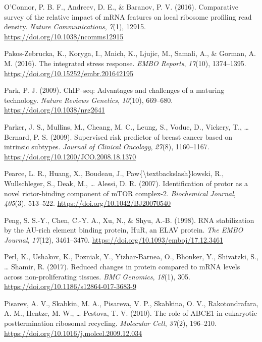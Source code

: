 \documentclass[12pt,openany]{book}
\begin{document}
\hypertarget{ref-OConnor2016}{}
O'Connor, P. B. F., Andreev, D. E., \& Baranov, P. V. (2016).
Comparative survey of the relative impact of mRNA features on local
ribosome profiling read density. \emph{Nature Communications},
\emph{7}(1), 12915. \url{https://doi.org/10.1038/ncomms12915}

\hypertarget{ref-Pakos-Zebrucka2016}{}
Pakos-Zebrucka, K., Koryga, I., Mnich, K., Ljujic, M., Samali, A., \&
Gorman, A. M. (2016). The integrated stress response. \emph{EMBO
Reports}, \emph{17}(10), 1374--1395.
\url{https://doi.org/10.15252/embr.201642195}

\hypertarget{ref-Park2009}{}
Park, P. J. (2009). ChIP--seq: Advantages and challenges of a maturing
technology. \emph{Nature Reviews Genetics}, \emph{10}(10), 669--680.
\url{https://doi.org/10.1038/nrg2641}

\hypertarget{ref-Parker2009}{}
Parker, J. S., Mullins, M., Cheang, M. C., Leung, S., Voduc, D.,
Vickery, T., \ldots{} Bernard, P. S. (2009). Supervised risk predictor
of breast cancer based on intrinsic subtypes. \emph{Journal of Clinical
Oncology}, \emph{27}(8), 1160--1167.
\url{https://doi.org/10.1200/JCO.2008.18.1370}

\hypertarget{ref-Pearce2007}{}
Pearce, L. R., Huang, X., Boudeau, J.,
Paw\{\textbackslash{}textbackslash\}lowski, R., Wullschleger, S., Deak,
M., \ldots{} Alessi, D. R. (2007). Identification of protor as a novel
rictor-binding component of mTOR complex-2. \emph{Biochemical Journal},
\emph{405}(3), 513--522. \url{https://doi.org/10.1042/BJ20070540}

\hypertarget{ref-Peng1998}{}
Peng, S. S.-Y., Chen, C.-Y. A., Xu, N., \& Shyu, A.-B. (1998). RNA
stabilization by the AU-rich element binding protein, HuR, an ELAV
protein. \emph{The EMBO Journal}, \emph{17}(12), 3461--3470.
\url{https://doi.org/10.1093/emboj/17.12.3461}

\hypertarget{ref-Perl2017}{}
Perl, K., Ushakov, K., Pozniak, Y., Yizhar-Barnea, O., Bhonker, Y.,
Shivatzki, S., \ldots{} Shamir, R. (2017). Reduced changes in protein
compared to mRNA levels across non-proliferating tissues. \emph{BMC
Genomics}, \emph{18}(1), 305.
\url{https://doi.org/10.1186/s12864-017-3683-9}

\hypertarget{ref-Pisarev2010}{}
Pisarev, A. V., Skabkin, M. A., Pisareva, V. P., Skabkina, O. V.,
Rakotondrafara, A. M., Hentze, M. W., \ldots{} Pestova, T. V. (2010).
The role of ABCE1 in eukaryotic posttermination ribosomal recycling.
\emph{Molecular Cell}, \emph{37}(2), 196--210.
\url{https://doi.org/10.1016/j.molcel.2009.12.034}
\end{document}
